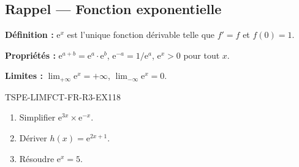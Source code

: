 

\subsection*{Rappel — Fonction exponentielle}

\textbf{Définition :} $\mathrm{e}^x$ est l'unique fonction dérivable telle que $f' = f$ et $f(0) = 1$.

\textbf{Propriétés :} $\mathrm{e}^{a+b} = \mathrm{e}^a \cdot \mathrm{e}^b$, $\mathrm{e}^{-a} = 1/\mathrm{e}^a$, $\mathrm{e}^x > 0$ pour tout $x$.

\textbf{Limites :} $\lim_{+\infty} \mathrm{e}^x = +\infty$, $\lim_{-\infty} \mathrm{e}^x = 0$.

\begin{exercice}{TSPE-LIMFCT-FR-R3-EX1}{1}{8}
\begin{enumerate}
  \item Simplifier $\mathrm{e}^{3x} \times \mathrm{e}^{-x}$.
  \item Dériver $h(x) = \mathrm{e}^{2x+1}$.
  \item Résoudre $\mathrm{e}^x = 5$.
\end{enumerate}
\end{exercice}

